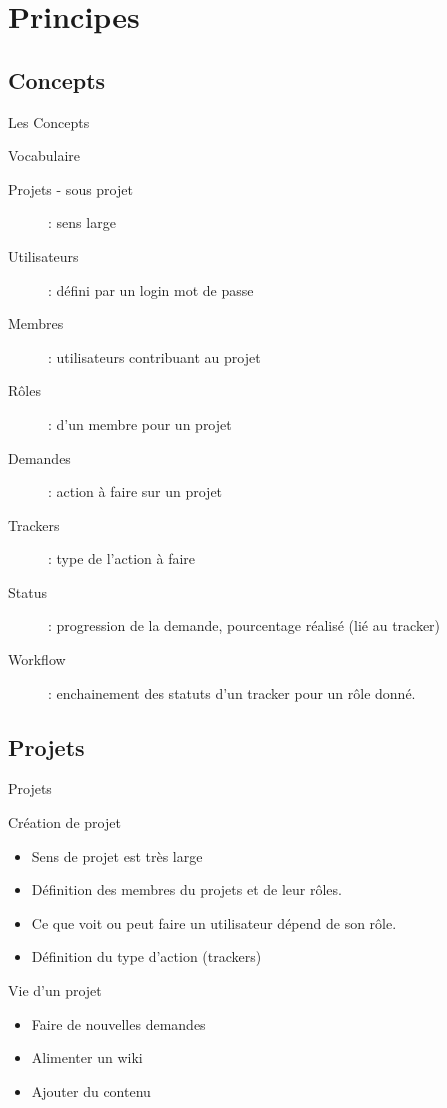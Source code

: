 \documentclass{beamer}
\begin{document}
\section[Principe]{Principes}
\subsection{Concepts}
\begin{frame}{Les Concepts}
\begin{block}{Vocabulaire}
	\begin{description}
		\item [Projets - sous projet] : sens large 
		\item [Utilisateurs] : défini par un login mot de passe
		\item [Membres] : utilisateurs contribuant au projet
		\item [Rôles] :  d'un membre pour un projet
		\item [Demandes] : action à faire sur un projet
		\item [Trackers] : type de l'action  à faire
		\item [Status] : progression de la demande, pourcentage réalisé (lié au tracker) 
		\item [Workflow] : enchainement des statuts d'un tracker pour un rôle donné.
	\end{description}

\end{block}
\end{frame}
	\subsection{Projets}
		\begin{frame}{Projets}
			\begin{block}{Création de projet}
				\begin{itemize}
					\item Sens de projet est très large
					\item Définition des membres du projets et de leur rôles.
					\item Ce que voit ou peut faire un utilisateur dépend de son rôle.
					\item Définition du type d'action  (trackers)
				\end{itemize}
			\end{block}
			\begin{block}{Vie d'un projet}
				\begin{itemize}
					\item Faire de nouvelles demandes
					\item Alimenter un wiki
					\item Ajouter du contenu
				\end{itemize}
			\end{block}
		\end{frame}
\end{document}
